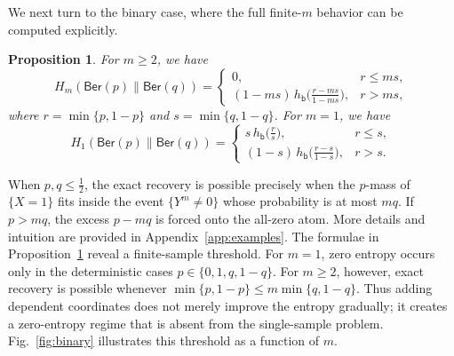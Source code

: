 \documentclass[journal]{IEEEtran}
\newtheorem{proposition}{Proposition}
\newcommand{\1}{\mathbf{1}}
\newcommand{\Ber}{\mathsf{Ber}}
\begin{document}
We next turn to the binary case, where the full finite-$m$ behavior can be
computed explicitly.

\begin{proposition}\label{Prop:Binary_m}
For $m\ge2$, we have
$$
H_m(\Ber(p)\|\Ber(q)) =
\begin{cases}
0, & r \le m s,\\
(1-ms)\,h_{\mathsf b}\!\big(\frac{r-ms}{1-ms}\big), & r>ms,
\end{cases}
$$
where $r=\min\{p,1-p\}$ and $s=\min\{q,1-q\}$. For $m=1$, we have
$$
H_1(\Ber(p)\|\Ber(q)) =
\begin{cases}
s\,h_{\mathsf b}\!\big(\frac{r}{s}\big), & r\le s,\\
(1-s)\,h_{\mathsf b}\!\big(\frac{r-s}{1-s}\big), & r>s.
\end{cases}
$$
\end{proposition}
When $p, q\leq \tfrac12$, the exact recovery is possible precisely when the \(p\)-mass of \(\{X=1\}\) fits inside the event $\{Y^m\neq 0\}$ whose probability is at most $mq$. If \(p>mq\), the excess \(p-mq\) is forced onto the all-zero atom. More details and intuition are provided in Appendix~\ref{app:examples}. The formulae in Proposition~\ref{Prop:Binary_m} reveal a finite-sample threshold. For $m=1$, zero entropy occurs
only in the deterministic cases $p\in\{0,1,q,1-q\}$. For $m\ge2$, however,
exact recovery is possible whenever \(\min\{p,1-p\} \le m\min\{q,1-q\}.\)
Thus adding dependent coordinates does not merely improve the entropy
gradually; it creates a zero-entropy regime that is absent from the
single-sample problem. Fig.~\ref{fig:binary} illustrates this threshold as a function of $m$. 

\end{document}
